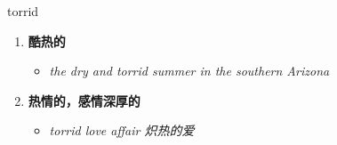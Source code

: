 
\begin{frame}
{\huge torrid}
\begin{center}
\begin{enumerate}\Large
  \item \textbf{酷热的}
  \begin{itemize}
    \item \em{\Large{the dry and torrid summer in the southern Arizona}}
  \end{itemize}
  \item \textbf{热情的，感情深厚的}
  \begin{itemize}
    \item \em{\Large{torrid love affair 炽热的爱}}
  \end{itemize}
\end{enumerate}
\end{center}
\end{frame}
